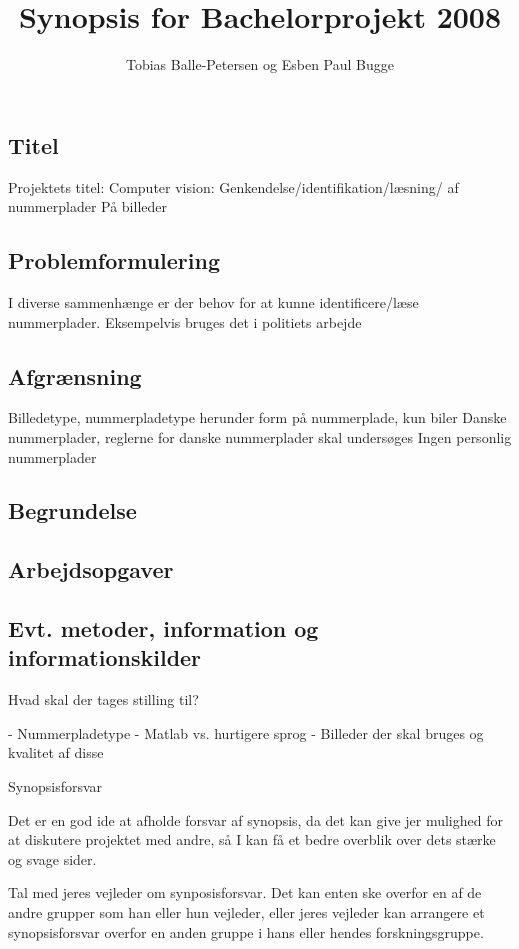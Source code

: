 \documentclass[10pt,a4paper,final]{report}
\author{Tobias Balle-Petersen og Esben Paul Bugge}
\title{Synopsis for Bachelorprojekt 2008}
\begin{document}
\maketitle

\subsection*{Titel}
Projektets titel: Computer vision: Genkendelse/identifikation/læsning/ af nummerplader
På billeder
\subsection*{Problemformulering}
I diverse sammenhænge er der behov for at kunne identificere/læse nummerplader. Eksempelvis bruges det i politiets arbejde
\subsection*{Afgrænsning}
Billedetype, nummerpladetype herunder form på nummerplade, kun biler
Danske nummerplader, reglerne for danske nummerplader skal undersøges
Ingen personlig nummerplader

\subsection*{Begrundelse}
\subsection*{Arbejdsopgaver}
\subsection*{Evt. metoder, information og informationskilder}

Hvad skal der tages stilling til?

- Nummerpladetype
- Matlab vs. hurtigere sprog
- Billeder der skal bruges og kvalitet af disse

Synopsisforsvar

Det er en god ide at afholde forsvar af synopsis, da det kan give jer mulighed for at diskutere projektet med andre, så I kan få et bedre overblik over dets stærke og svage sider.

Tal med jeres vejleder om synposisforsvar. Det kan enten ske overfor en af de andre grupper som han eller hun vejleder, eller jeres vejleder kan arrangere et synopsisforsvar overfor en anden gruppe i hans eller hendes forskningsgruppe.
\end{document}
